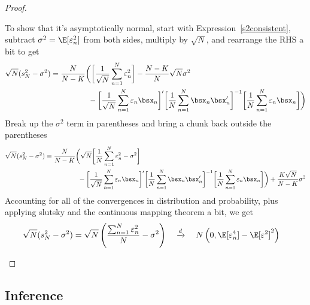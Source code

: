 \documentclass[12pt]{article}
\theoremstyle{plain}
\theoremstyle{definition}
\theoremstyle{remark}
\newcommand{\dto}{\xrightarrow{d}}
\newcommand{\sumnN}{\sum^N_{n=1}}
\begin{document}
\begin{proof}
\begin{enumerate}
    To show that it's asymptotically normal, start with
    Expression~\ref{s2consistent}, subtract
    $\sigma^2=\E[\varepsilon_n^2]$ from both sides, multiply by
    $\sqrt{N}$, and rearrange the RHS a bit to get
    \begin{align*}
      \sqrt{N}(s^2_N - \sigma^2)
      &= \frac{N}{N-K}
      \bigg(
        \bigg[
        \frac{1}{\sqrt{N}} \sumnN \varepsilon_n^2
         \bigg]
      - \frac{N-K}{N}\sqrt{N}\sigma^2
      \\
      &\qquad\qquad\quad
      - \bigg[
        \frac{1}{\sqrt{N}} \sumnN \varepsilon_n \bsx_n
        \bigg]'
        \bigg[
        \frac{1}{N} \sumnN \bsx_n\bsx_n'
        \bigg]^{-1}
        \bigg[
        \frac{1}{N} \sumnN \varepsilon_n \bsx_n
        \bigg]
      \bigg)
    \end{align*}
    Break up the $\sigma^2$ term in parentheses and bring a chunk back
    outside the parentheses
    \begin{align*}
      \sqrt{N}(s^2_N - \sigma^2)
      &= \frac{N}{N-K}
      \bigg(
        \sqrt{N}\bigg[
        \frac{1}{N} \sumnN \varepsilon_n^2
        -\sigma^2
         \bigg]
      \\
      &\qquad\qquad\quad
      - \bigg[
        \frac{1}{\sqrt{N}} \sumnN \varepsilon_n \bsx_n
        \bigg]'
        \bigg[
        \frac{1}{N} \sumnN \bsx_n\bsx_n'
        \bigg]^{-1}
        \bigg[
        \frac{1}{N} \sumnN \varepsilon_n \bsx_n
        \bigg]
      \bigg)
      + \frac{K\sqrt{N}}{N-K}\sigma^2
    \end{align*}
    Accounting for all of the convergences in distribution and
    probability, plus applying slutsky and the continuous mapping
    theorem a bit, we get
    \begin{align*}
      \sqrt{N}(s^2_N - \sigma^2)
      &=
        \sqrt{N}
        \left(
        \frac{\sumnN \varepsilon_n^2}{N}
        -\sigma^2
        \right)
      \quad\dto\quad
      N\left(0,\E[\varepsilon_n^4]-\E[\varepsilon^2]^2\right)
    \end{align*}
\end{enumerate}
\end{proof}

\clearpage
\subsection{Inference}
\end{document}
